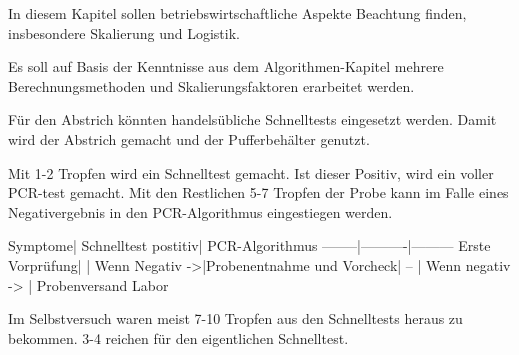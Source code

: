 In diesem Kapitel sollen betriebswirtschaftliche Aspekte Beachtung finden, insbesondere Skalierung und Logistik.

Es soll auf Basis der Kenntnisse aus dem Algorithmen-Kapitel mehrere Berechnungsmethoden und Skalierungsfaktoren erarbeitet werden.

Für den Abstrich könnten handelsübliche Schnelltests eingesetzt werden. Damit wird der Abstrich gemacht und der Pufferbehälter genutzt.

Mit 1-2 Tropfen wird ein Schnelltest gemacht. Ist dieser Positiv, wird ein voller PCR-test gemacht. Mit den Restlichen 5-7 Tropfen der Probe kann im Falle eines Negativergebnis in den PCR-Algorithmus eingestiegen werden.

Symptome| Schnelltest postitiv| PCR-Algorithmus
--------|----------|---------
Erste Vorprüfung| |
Wenn Negativ ->|Probenentnahme und Vorcheck|
-- | Wenn negativ -> | Probenversand Labor

Im Selbstversuch waren meist 7-10 Tropfen aus den Schnelltests heraus zu bekommen. 3-4 reichen für den eigentlichen Schnelltest.
\fi